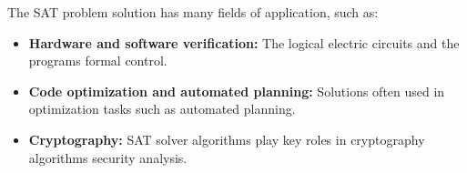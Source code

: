\documentclass{article}
\begin{document}
The SAT problem solution has many fields of application, such as:
\begin{itemize}
    \item \textbf{Hardware and software verification:} The logical electric circuits and the programs formal control.
    \item \textbf{Code optimization and automated planning:} Solutions often used in optimization tasks such as automated planning.
    \item \textbf{Cryptography:} SAT solver algorithms play key roles in cryptography algorithms security analysis.
\end{itemize}
\end{document}
